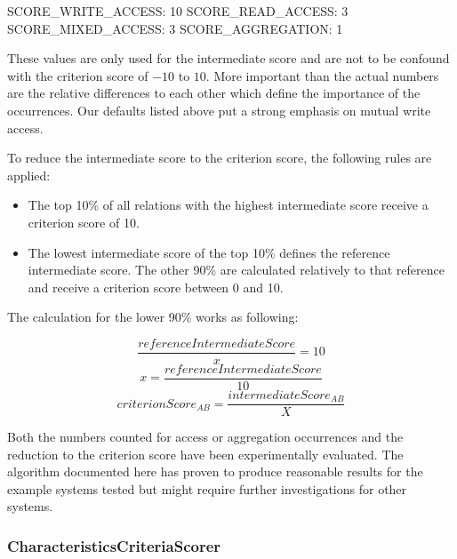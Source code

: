 SCORE\_WRITE\_ACCESS: 10 \newline
SCORE\_READ\_ACCESS: 3  \newline
SCORE\_MIXED\_ACCESS: 3 \newline 
SCORE\_AGGREGATION: 1 \newline 

These values are only used for the intermediate score and are not to be confound with the criterion score of $-10$ to $10$. More important than the actual numbers are the relative differences to each other which define the importance of the occurrences. Our defaults listed above put a strong emphasis on mutual write access. 

To reduce the intermediate score to the criterion score, the following rules are applied:

\begin{itemize}
	\item The top 10\% of all relations with the highest intermediate score receive a criterion score of 10.
	\item The lowest intermediate score of the top 10\% defines the reference intermediate score. The other 90\% are calculated relatively to that reference and receive a criterion score between 0 and 10.
\end{itemize}

The calculation for the lower 90\% works as following:


\begin{equation}
\frac{referenceIntermediateScore}{x} = 10
\end{equation}
\begin{equation}
x = \frac{referenceIntermediateScore}{10}
\end{equation}
\begin{equation}
criterionScore_{AB} = \frac{intermediateScore_{AB}}{X}
\end{equation}

Both the numbers counted for access or aggregation occurrences and the reduction to the criterion score have been experimentally evaluated. The algorithm documented here has proven to produce reasonable results for the example systems tested but might require further investigations for other systems. 

\subsubsection{CharacteristicsCriteriaScorer}

